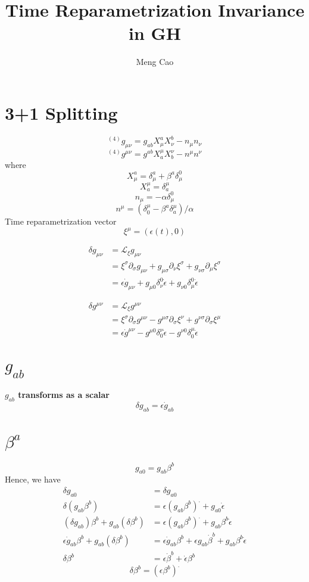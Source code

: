 \documentclass{article}
\begin{document}
\title{Time Reparametrization Invariance in GH}
\author{Meng Cao}
\maketitle
\section{3+1 Splitting}
\[
^{(4)}g_{\mu\nu} = g_{ab}X^{a}_{\mu}X^{b}_{\nu} - n_{\mu}n_{\nu}
\]
\[
^{(4)}g^{\mu\nu} = g^{ab}X^{\mu}_{a}X^{\nu}_{b} - n^{\mu}n^{\nu}
\]
where
\[
X^{a}_{\mu} = \delta^{a}_{\mu} + \beta^{a}\delta^{0}_{\mu} 
\]
\[
X^{\mu}_{a} = \delta^{\mu}_{a}
\]
\[
n_{\mu} = -\alpha \delta^{0}_{\mu}
\]
\[
n^{\mu} = (\delta^{\mu}_{0} - \beta^{a}\delta_{a}^{\mu})/\alpha
\]
Time reparametrization vector
\[
\xi^{\mu} = (\epsilon (t),0)
\]

\begin{align*}
\delta g_{\mu\nu} & = \mathcal{L}_{\xi} g_{\mu\nu} \\
& = \xi^{\sigma} \partial_{\sigma}g_{\mu\nu} + g_{\mu\sigma}\partial_{\nu}\xi^{\sigma} + g_{\nu \sigma}\partial_{\mu}\xi^{\sigma}\\
& = \epsilon \dot{g}_{\mu \nu} + g_{\mu 0} \delta^{0}_{\nu}\dot{\epsilon} + g_{\nu 0} \delta^{0}_{\mu} \dot{\epsilon}
\end{align*}

\begin{align*}
\delta g^{\mu\nu} & = \mathcal{L}_{\xi} g^{\mu\nu} \\
& = \xi^{\sigma} \partial_{\sigma}g^{\mu\nu} - g^{\mu\sigma}\partial_{\sigma}\xi^{\nu} + g^{\nu \sigma}\partial_{\sigma}\xi^{\mu}\\
& = \epsilon \dot{g}^{\mu \nu} - g^{\mu 0} \delta_{0}^{\nu}\dot{\epsilon} - g^{\nu 0} \delta_{0}^{\mu} \dot{\epsilon}
\end{align*}
\section{$g_{ab}$}
{\bf {\color{red}$g_{ab}$ transforms as a scalar}}
\[
\delta g_{ab} = \epsilon \dot{g}_{ab}
\]
\section{$\beta^{a}$}
\[
g_{a0} = g_{ab}\beta^{b}
\]
Hence, we have
\begin{align*}
\delta g_{a0} & = \delta g_{a0}\\
\delta (g_{ab}\beta^{b}) & = \epsilon (g_{ab}\beta^{b})^{.} + g_{a0}{\dot \epsilon}\\
(\delta g_{ab}) \beta^{b} + g_{ab} (\delta \beta^{b}) & = \epsilon (g_{ab}\beta^{b})^{.} + g_{ab}\beta^{b}{\dot \epsilon}\\
\epsilon {\dot g}_{ab} \beta^{b} + g_{ab} (\delta \beta^{b}) & = \epsilon {\dot g}_{ab} \beta^{b} + \epsilon g_{ab} {\dot \beta}^{b} + g_{ab}\beta^{b} {\dot \epsilon}\\
\delta \beta^{b} & = \epsilon {\dot \beta}^{b} + {\dot \epsilon} \beta^{b}
\end{align*}
\[
\boxed{
\delta \beta^{b} = (\epsilon \beta^{b})^{.}
}
\]
\end{document}
